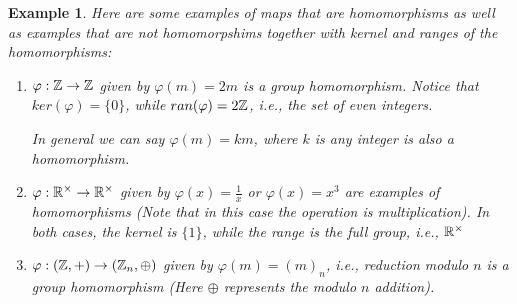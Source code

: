 \documentclass[12pt]{article}
\theoremstyle{plain}
\newtheorem{example}{Example}
\theoremstyle{definition}
\theoremstyle{remark}
\begin{document}
\begin{example}
Here are some examples of maps that are homomorphisms as well as examples that are not homomorpshims together with kernel and ranges of the homomorphisms:
\begin{enumerate}
    \item $\varphi: \mathbb{Z}\rightarrow \mathbb{Z}$ given by $\varphi(m)=2m$
 is a group homomorphism.
Notice that $ker(\varphi) = \{0\}$, while $ran(\varphi) = 2\mathbb{Z}$, i.e., the set of even integers.

 In general we can say $\varphi(m)=km$, where $k$ is any integer is also a homomorphism.

 \item $\varphi:\mathbb{R}^{\times} \rightarrow \mathbb{R}^{\times}$ given by $\varphi(x)=\frac{1}{x}$ or $\varphi(x)=x^3$ are examples of homomorphisms (Note that in this case the operation is multiplication). In both cases, the kernel is $\{1\}$, while the range is the full group, i.e., $\mathbb{R}^{\times}$
 \item $\varphi:(\mathbb{Z},+) \rightarrow (\mathbb{Z}_n, \oplus)$ given by
 $\varphi(m) = (m)_n$, i.e., reduction modulo $n$ is a group homomorphism (Here $\oplus$ represents the modulo $n$ addition).


\end{enumerate}
\end{example}
\end{document}

